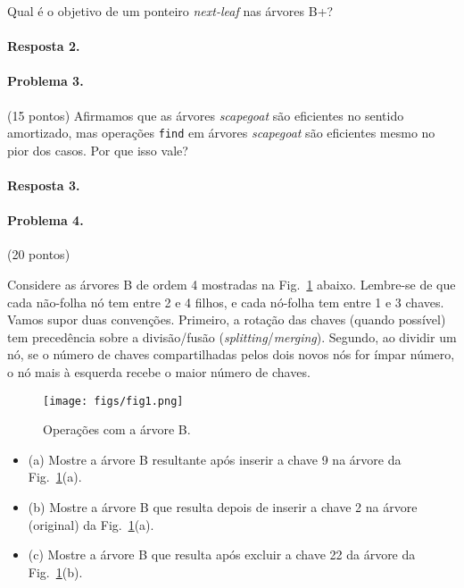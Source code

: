 \documentclass{article}
\begin{document}
Qual é o objetivo de um ponteiro \textit{next-leaf} nas árvores B+?

\paragraph{Resposta 2.}

\paragraph{Problema 3.} (15 pontos) 
Afirmamos que as árvores \textit{scapegoat} são eficientes no sentido amortizado, mas operações \texttt{find} em árvores \textit{scapegoat} são eficientes mesmo no pior dos casos. Por que isso vale?

\paragraph{Resposta 3.}

\paragraph{Problema 4.} (20 pontos)

Considere as árvores B de ordem 4 mostradas na Fig.~\ref{fig:prob4} abaixo. Lembre-se de que cada não-folha
nó tem entre 2 e 4 filhos, e cada nó-folha tem entre 1 e 3 chaves. Vamos supor
duas convenções. Primeiro, a rotação das chaves (quando possível) tem precedência sobre a divisão/fusão (\textit{splitting}/\textit{merging}).
Segundo, ao dividir um nó, se o número de chaves compartilhadas pelos dois novos nós for ímpar
número, o nó mais à esquerda recebe o maior número de chaves.

\begin{figure}[h]
    \centering
    \texttt{[image: figs/fig1.png]}
    \caption{Operações com a árvore B.}
    \label{fig:prob4}
\end{figure}

\begin{itemize}
    \item (a) Mostre a árvore B resultante após inserir a chave 9 na árvore da Fig.~\ref{fig:prob4}(a).
\item (b) Mostre a árvore B que resulta depois de inserir a chave 2 na árvore (original) da Fig.~\ref{fig:prob4}(a).
\item (c) Mostre a árvore B que resulta após excluir a chave 22 da árvore da Fig.~\ref{fig:prob4}(b).
\end{itemize}
\end{document}
